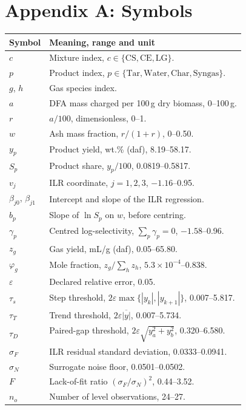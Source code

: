 \documentclass[withoutpreface,bwprint]{apmcmthesis}
\begin{document}
\appendix
\section{Appendix A: Symbols}
\begingroup
\footnotesize
\begin{longtable}{@{}p{}p{}@{}}
\toprule
Symbol & Meaning, range and unit\\
\midrule
\endhead
$c$ & Mixture index, $c\in\{\mathrm{CS},\mathrm{CE},\mathrm{LG}\}$.\\
$p$ & Product index, $p\in\{\mathrm{Tar},\mathrm{Water},\mathrm{Char},\mathrm{Syngas}\}$.\\
$g$, $h$ & Gas species index.\\
$a$ & DFA mass charged per 100\,g dry biomass, 0--100\,g.\\
$r$ & $a/100$, dimensionless, 0--1.\\
$w$ & Ash mass fraction, $r/(1+r)$, 0--0.50.\\
$y_p$ & Product yield, wt.\% (daf), 8.19--58.17.\\
$S_p$ & Product share, $y_p/100$, 0.0819--0.5817.\\
$v_j$ & ILR coordinate, $j=1,2,3$, $-1.16$--0.95.\\
$\beta_{j0}$, $\beta_{j1}$ & Intercept and slope of the ILR regression.\\
$b_p$ & Slope of $\ln S_p$ on $w$, before centring.\\
$\gamma_p$ & Centred log-selectivity, $\sum_p\gamma_p=0$, $-1.58$--0.96.\\
$z_g$ & Gas yield, mL/g (daf), 0.05--65.80.\\
$\varphi_g$ & Mole fraction, $z_g/\sum_h z_h$, $5.3\times10^{-4}$--0.838.\\
$\varepsilon$ & Declared relative error, 0.05.\\
$\tau_{s}$ & Step threshold, $2\varepsilon\max\{|y_k|,|y_{k+1}|\}$, 0.007--5.817.\\
$\tau_{T}$ & Trend threshold, $2\varepsilon\overline{|y|}$, 0.007--5.734.\\
$\tau_{D}$ & Paired-gap threshold, $2\varepsilon\sqrt{y_a^2+y_b^2}$, 0.320--6.580.\\
$\sigma_{F}$ & ILR residual standard deviation, 0.0333--0.0941.\\
$\sigma_{N}$ & Surrogate noise floor, 0.0501--0.0502.\\
$F$ & Lack-of-fit ratio $(\sigma_{F}/\sigma_{N})^2$, 0.44--3.52.\\
$n_{o}$ & Number of level observations, 24--27.\\

\end{longtable}
\end{document}
